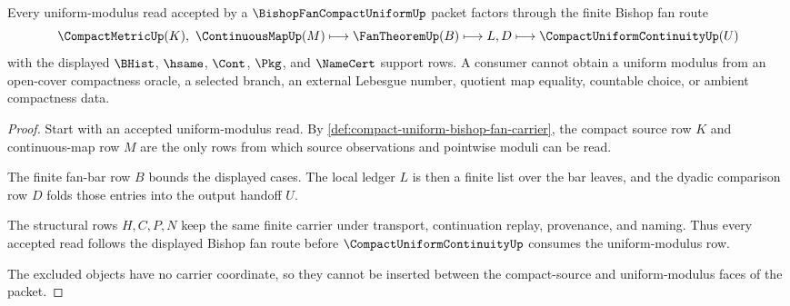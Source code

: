 \begin{theorem}\label{thm:compact-uniform-bishop-fan-modulus-route}
Every uniform-modulus read accepted by a $\BishopFanCompactUniformUp$ packet factors through the finite Bishop fan route
$$
\CompactMetricUp(K),\ \ContinuousMapUp(M) \longmapsto \FanTheoremUp(B) \longmapsto L,D \longmapsto \CompactUniformContinuityUp(U)
$$
with the displayed $\BHist$, $\hsame$, $\Cont$, $\Pkg$, and $\NameCert$ support rows. A consumer cannot obtain a uniform modulus from an open-cover compactness oracle, a selected branch, an external Lebesgue number, quotient map equality, countable choice, or ambient compactness data.
\end{theorem}
\begin{proof}
Start with an accepted uniform-modulus read. By \autoref{def:compact-uniform-bishop-fan-carrier}, the compact source row $K$ and continuous-map row $M$ are the only rows from which source observations and pointwise moduli can be read.

The finite fan-bar row $B$ bounds the displayed cases. The local ledger $L$ is then a finite list over the bar leaves, and the dyadic comparison row $D$ folds those entries into the output handoff $U$.

The structural rows $H,C,P,N$ keep the same finite carrier under transport, continuation replay, provenance, and naming. Thus every accepted read follows the displayed Bishop fan route before $\CompactUniformContinuityUp$ consumes the uniform-modulus row.

The excluded objects have no carrier coordinate, so they cannot be inserted between the compact-source and uniform-modulus faces of the packet.
\end{proof}

